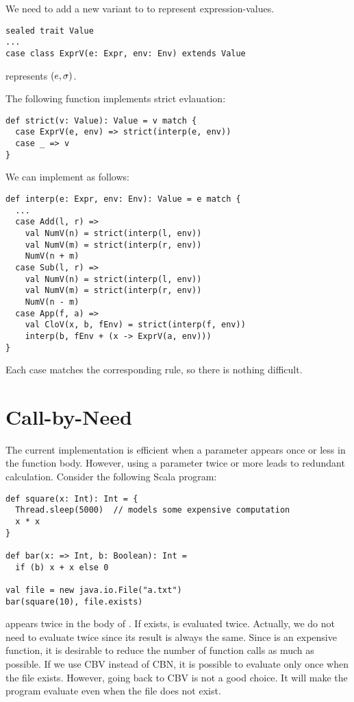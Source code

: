 We need to add a new variant to  to represent expression-values.

\begin{verbatim}
sealed trait Value
...
case class ExprV(e: Expr, env: Env) extends Value
\end{verbatim}

 represents $(e,\sigma)$.

The following function implements strict evlauation:

\begin{verbatim}
def strict(v: Value): Value = v match {
  case ExprV(e, env) => strict(interp(e, env))
  case _ => v
}
\end{verbatim}

We can implement  as follows:

\begin{verbatim}
def interp(e: Expr, env: Env): Value = e match {
  ...
  case Add(l, r) =>
    val NumV(n) = strict(interp(l, env))
    val NumV(m) = strict(interp(r, env))
    NumV(n + m)
  case Sub(l, r) =>
    val NumV(n) = strict(interp(l, env))
    val NumV(m) = strict(interp(r, env))
    NumV(n - m)
  case App(f, a) =>
    val CloV(x, b, fEnv) = strict(interp(f, env))
    interp(b, fEnv + (x -> ExprV(a, env)))
}
\end{verbatim}

Each case matches the corresponding rule, so there is nothing difficult.

\section{Call-by-Need}

The current implementation is efficient when a parameter appears once or less in
the function body. However, using a parameter twice or more leads to redundant
calculation. Consider the following Scala program:

\begin{verbatim}
def square(x: Int): Int = {
  Thread.sleep(5000)  // models some expensive computation
  x * x
}

def bar(x: => Int, b: Boolean): Int =
  if (b) x + x else 0

val file = new java.io.File("a.txt")
bar(square(10), file.exists)
\end{verbatim}

 appears twice in the body of . If  exists,  is
evaluated twice. Actually, we do not need to evaluate  twice
since its result is always the same. Since  is an expensive
function, it is desirable to reduce the number of function calls as much as possible.
If we use CBV instead of CBN, it is possible to evaluate  only
once when the file exists.
However, going back to CBV is not a good choice. It will make the program
evaluate  even when the file does not exist.

